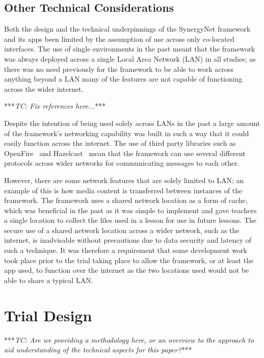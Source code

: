 \documentclass[a4paper,11pt]{article}
\begin{document}
\subsection{Other Technical Considerations}

Both the design and the technical underpinnings of the SynergyNet framework and its apps been limited by the assumption of use across only co-located interfaces.
The use of single environments in the past meant that the framework was always deployed across a single Local Area Network (LAN) in all studies; as there was no need previously for the framework to be able to work across anything beyond a LAN many of the features are not capable of functioning across the wider internet.

***{\emph{TC: Fix references here...}}***

Despite the intention of being used solely across LANs in the past a large amount of the framework's networking capability was built in such a way that it could easily function across the internet.
The use of third party libraries such as OpenFire~\cite{igniterealtime:2016} and Hazelcast~\cite{hazelcast:2016} mean that the framework can use several different protocols across wider networks for communicating messages to each other.

However, there are some network features that are solely limited to LAN; an example of this is how media content is transferred between instances of the framework.
The framework uses a shared network location as a form of cache, which was beneficial in the past as it was simple to implement and gave teachers a single location to collect the files used in a lesson for use in future lessons.
The secure use of a shared network location across a wider network, such as the internet, is inadvisable without precautions due to data security and latency of such a technique.
It was therefore a requirement that some development work took place prior to the trial taking place to allow the framework, or at least the app used, to function over the internet as the two locations used would not be able to share a typical LAN.


\section{Trial Design}

***{\emph{TC: Are we providing a methodology here, or an overview to the approach to aid understanding of the technical aspects for this paper?}}***
\end{document}
